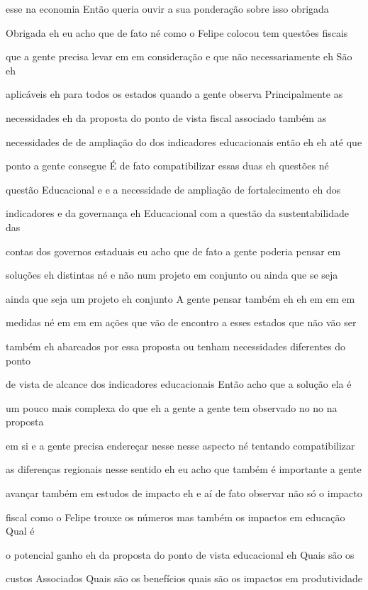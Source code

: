 \documentclass[a4paper,12pt]{article}
\begin{document}
esse na economia Então queria ouvir a sua ponderação sobre isso obrigada

Obrigada eh eu acho que de fato né como o Felipe colocou tem questões fiscais

que a gente precisa levar em em consideração e que não necessariamente eh São eh

aplicáveis eh para todos os estados quando a gente observa Principalmente as

necessidades eh da proposta do ponto de vista fiscal associado também as

necessidades de de ampliação do dos indicadores educacionais então eh eh até que

ponto a gente consegue É de fato compatibilizar essas duas eh questões né

questão Educacional e e a necessidade de ampliação de fortalecimento eh dos

indicadores e da governança eh Educacional com a questão da sustentabilidade das

contas dos governos estaduais eu acho que de fato a gente poderia pensar em

soluções eh distintas né e não num projeto em conjunto ou ainda que se seja

ainda que seja um projeto eh conjunto A gente pensar também eh eh em em em

medidas né em em em ações que vão de encontro a esses estados que não vão ser

também eh abarcados por essa proposta ou tenham necessidades diferentes do ponto

de vista de alcance dos indicadores educacionais Então acho que a solução ela é

um pouco mais complexa do que eh a gente a gente tem observado no no na proposta

em si e a gente precisa endereçar nesse nesse aspecto né tentando compatibilizar

as diferenças regionais nesse sentido eh eu acho que também é importante a gente

avançar também em estudos de impacto eh e aí de fato observar não só o impacto

fiscal como o Felipe trouxe os números mas também os impactos em educação Qual é

o potencial ganho eh da proposta do ponto de vista educacional eh Quais são os

custos Associados Quais são os benefícios quais são os impactos em produtividade
\end{document}
